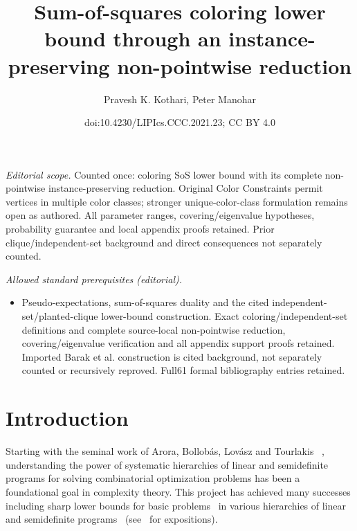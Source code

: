 \documentclass[10pt,a4paper]{article}
\title{Sum-of-squares coloring lower bound through an instance-preserving non-pointwise reduction}
\author{Pravesh K. Kothari, Peter Manohar}
\date{doi:10.4230/LIPIcs.CCC.2021.23; CC BY 4.0}
\theoremstyle{definition}
\newcommand{\Lovasz}{Lov\'asz\xspace}
\newcommand{\Bollobas}{Bollob\'as\xspace}
\DeclareMathOperator{\pE}{\tilde{\mathbb{E}}}
\begin{document}
\maketitle
\noindent\textit{Editorial scope.} Counted once: coloring SoS lower bound with its complete non-pointwise instance-preserving reduction. Original Color Constraints permit vertices in multiple color classes; stronger unique-color-class formulation remains open as authored. All parameter ranges, covering/eigenvalue hypotheses, probability guarantee and local appendix proofs retained. Prior clique/independent-set background and direct consequences not separately counted.\par\medskip
\noindent\textit{Allowed standard prerequisites (editorial).}\begin{itemize}
\item Pseudo-expectations, sum-of-squares duality and the cited independent-set/planted-clique lower-bound construction. Exact coloring/independent-set definitions and complete source-local non-pointwise reduction, covering/eigenvalue verification and all appendix support proofs retained. Imported Barak et al. construction is cited background, not separately counted or recursively reproved. Full61 formal bibliography entries retained.
\end{itemize}\medskip

\renewcommand{\pE}{\tilde{\mathbb{E}}}



\section{Introduction}

Starting with the seminal work of Arora, \Bollobas, \Lovasz and Tourlakis ~\cite{MR2322869-Arora06}, understanding the power of systematic hierarchies of linear and semidefinite programs for solving combinatorial optimization problems has been a foundational goal in complexity theory. This project has achieved many successes including sharp lower bounds for basic problems~\cite{MR2402454-Schoenebeck07,MR2780074-Charikar09,MR2648454-Raghavendra09,DBLP:conf/ipco/BenabbasM10,DBLP:conf/fsttcs/BenabbasCGM11,DBLP:journals/toc/BenabbasGMT12,DBLP:conf/coco/GhoshT17} in various hierarchies of linear and semidefinite programs~\cite{MR1806434-Lasserre00,parrilo2000structured, MR1061981-Sherali90, DBLP:journals/siamjo/LovaszS91} (see~\cite{MR2894694-Chlamtac12,TCS-086} for expositions).
\end{document}
